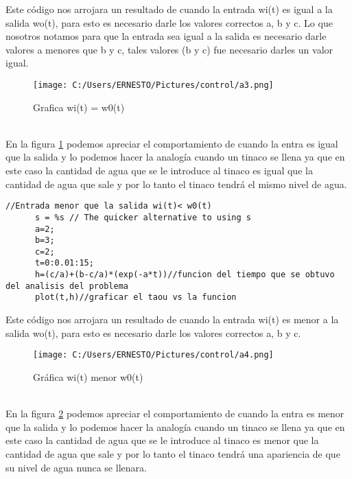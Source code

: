 \documentclass{article}
\begin{document}
Este código nos arrojara un resultado de cuando la entrada wi(t) es igual a la salida wo(t), para esto es necesario darle los valores correctos a, b y c. Lo que nosotros notamos para que la entrada sea igual a la salida es necesario darle valores a menores que b y c, tales valores (b y c) fue necesario darles un valor igual.\\
\begin{figure}[h!]
	\centering
\texttt{[image: C:/Users/ERNESTO/Pictures/control/a3.png]}
	\caption{Grafica wi(t) = w0(t)}
	\label{fig:C:/Users/ERNESTO/Pictures/control/a3.png}
\end{figure}\\
En la figura \ref{fig:C:/Users/ERNESTO/Pictures/control/a3.png} podemos apreciar el comportamiento de cuando la entra es igual que la salida y lo podemos hacer la analogía cuando un tinaco se llena ya que en este caso la cantidad de agua que se le introduce al tinaco es igual que la cantidad de agua que sale y por lo tanto el tinaco tendrá el mismo nivel de agua.\\
\begin{lstlisting}[frame=single]
      //Entrada menor que la salida wi(t)< w0(t)
      s = %s // The quicker alternative to using s
      a=2;  
      b=3;
      c=2;
      t=0:0.01:15;
      h=(c/a)+(b-c/a)*(exp(-a*t))//funcion del tiempo que se obtuvo del analisis del problema
      plot(t,h)//graficar el taou vs la funcion

\end{lstlisting}
Este código nos arrojara un resultado de cuando la entrada wi(t) es menor a la salida wo(t), para esto es necesario darle los valores correctos a, b y c.\\
\begin{figure}[h!]
	\centering
\texttt{[image: C:/Users/ERNESTO/Pictures/control/a4.png]}
	\caption{Gráfica wi(t) menor w0(t)}
	\label{fig:C:/Users/ERNESTO/Pictures/control/a4.png}
\end{figure}\\
En la figura \ref{fig:C:/Users/ERNESTO/Pictures/control/a4.png} podemos apreciar el comportamiento de cuando la entra es menor que la salida y lo podemos hacer la analogía cuando un tinaco se llena ya que en este caso la cantidad de agua que se le introduce al tinaco es menor que la cantidad de agua que sale y por lo tanto el tinaco tendrá una apariencia de que su nivel de agua nunca se llenara.
\end{document}
